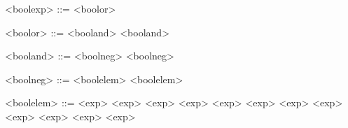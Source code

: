 \begin{grammarEx}
	<bool\textunderscore exp> ::= <bool\textunderscore or>
	
	<bool\textunderscore or> ::= <bool\textunderscore and> \lit{\opor{}} <bool\textunderscore and>

	<bool\textunderscore{}and> ::= <bool\textunderscore neg> \lit{\opand} <bool\textunderscore{}neg>

	<bool\textunderscore neg> ::= \lit{\opneg{}} <bool\textunderscore elem>
	\alt <bool\textunderscore elem>

	<bool\textunderscore elem> ::= <exp> \lit{\opless{}} <exp>
	\alt <exp> \lit{\opgreater{}} <exp>
	\alt <exp> \lit{\oplesseq{}} <exp>
	\alt <exp> \lit{\opgreatereq{}} <exp>
	\alt <exp> \lit{\opeq{}} <exp>
	\alt <exp> \lit{\opuneq{}} <exp>
	\alt {}
	\alt {}
\end{grammarEx}